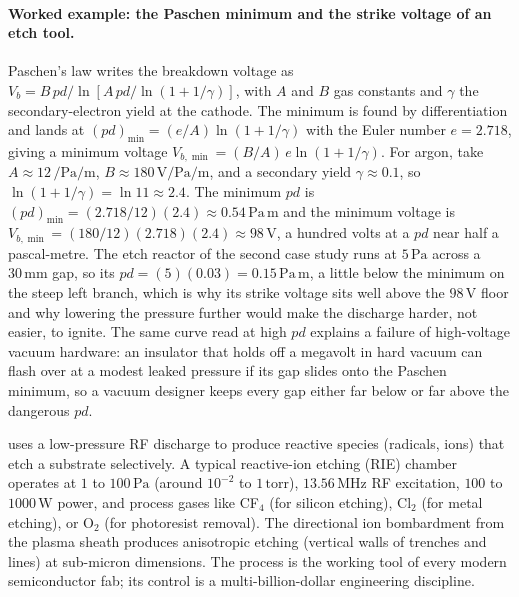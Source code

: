 

\paragraph{Worked example: the Paschen minimum and the strike voltage of an etch tool.}
Paschen's law writes the breakdown voltage as $V_b = B\,pd/\ln[A\,pd/\ln(1+
1/\gamma)]$, with $A$ and $B$ gas constants and $\gamma$ the secondary-electron
yield at the cathode. The minimum is found by differentiation and lands at
$(pd)_{\min} = (e/A)\ln(1+1/\gamma)$ with the Euler number $e = 2.718$, giving
a minimum voltage $V_{b,\min} = (B/A)\,e\ln(1+1/\gamma)$. For argon, take $A
\approx 12\,\si{\per\pascal\per\meter}$, $B \approx 180\,\si{\volt\per\pascal
\per\meter}$, and a secondary yield $\gamma \approx 0.1$, so $\ln(1+1/\gamma)
= \ln 11 \approx 2.4$. The minimum $pd$ is $(pd)_{\min} = (2.718/12)(2.4)
\approx 0.54\,\si{\pascal}\,\si{\meter}$ and the minimum voltage is
$V_{b,\min} = (180/12)(2.718)(2.4) \approx 98\,\si{\volt}$, a hundred volts at
a $pd$ near half a pascal-metre. The etch reactor of the second case study
runs at $5\,\si{\pascal}$ across a $30\,\si{\milli\meter}$ gap, so its $pd =
(5)(0.03) = 0.15\,\si{\pascal}\,\si{\meter}$, a little below the minimum on
the steep left branch, which is why its strike voltage sits well above the
$98\,\si{\volt}$ floor and why lowering the pressure further would make the
discharge harder, not easier, to ignite. The same curve read at high $pd$
explains a failure of high-voltage vacuum hardware: an insulator that holds
off a megavolt in hard vacuum can flash over at a modest leaked pressure if
its gap slides onto the Paschen minimum, so a vacuum designer keeps every gap
either far below or far above the dangerous $pd$.

 uses a low-pressure RF discharge to produce
reactive species (radicals, ions) that etch a substrate selectively.
A typical reactive-ion etching (RIE) chamber operates at $1$ to
$100\,\si{\pascal}$ (around $10^{-2}$ to $1\,\text{torr}$), $13.56\,\si{
\mega\hertz}$ RF excitation, $100$ to $1000\,\si{\watt}$ power, and
process gases like CF$_{4}$ (for silicon etching), Cl$_{2}$ (for
metal etching), or O$_{2}$ (for photoresist removal). The directional
ion bombardment from the plasma sheath produces anisotropic etching
(vertical walls of trenches and lines) at sub-micron dimensions. The
process is the working tool of every modern semiconductor fab; its
control is a multi-billion-dollar engineering discipline.

